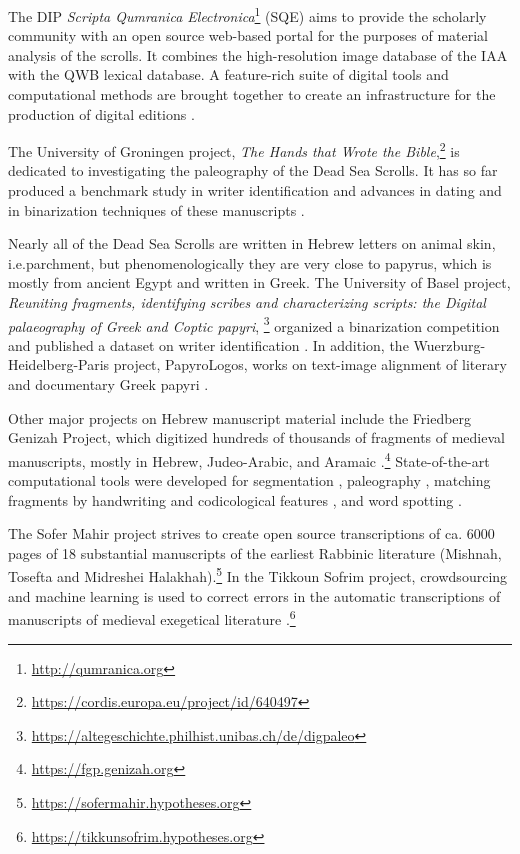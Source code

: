 The DIP \textit{Scripta Qumranica
Electronica}\footnote{\url{http://qumranica.org}} (SQE) 
aims to provide the scholarly community with an open source web-based portal
for the purposes of material analysis of the  scrolls.  It combines the
high-resolution image database of the IAA with the QWB lexical database.  A
feature-rich suite of digital tools and computational methods are brought
together to create an infrastructure for the production of digital editions
\cite{SQE}. %

The University of Groningen 
project, \textit{The Hands that Wrote the
Bible},\footnote{\url{https://cordis.europa.eu/project/id/640497}} is dedicated
to investigating the paleography of the Dead Sea Scrolls.  It has so far
produced a benchmark study in writer identification \cite {DhaliEtAl2017} and
advances in dating \cite{DhaliEtAl2020dating} and in binarization techniques of
these manuscripts \cite{DhaliEtAl2019}.

Nearly all of the Dead Sea Scrolls are written in Hebrew letters on animal
skin, i.e.\@ parchment, but phenomenologically they are very close to papyrus,
which is mostly from ancient Egypt and written in Greek.  The University of
Basel 
project, \textit{Reuniting fragments, identifying scribes and characterizing
scripts: the Digital palaeography of Greek and Coptic papyri},%
\footnote{\url{https://altegeschichte.philhist.unibas.ch/de/digpaleo}}
organized a binarization competition \cite{Pratikakis2019} and published a
dataset on writer identification \cite{Mohammed2019b}.  In addition, the
Wuerzburg-Heidelberg-Paris project, PapyroLogos, works on text-image alignment
of literary and documentary Greek papyri \cite{KiesslingStoekl2019}.

Other major projects on Hebrew manuscript material include the 
Friedberg Genizah Project, which digitized hundreds of thousands of fragments
of medieval manuscripts, mostly in Hebrew, Judeo-Arabic, and Aramaic
\cite{FGP}.\footnote{\url{https://fgp.genizah.org}} State-of-the-art
computational tools were developed for segmentation \cite{Catalog}, paleography
\cite{Paleo}, matching fragments by handwriting and codicological features
\cite{Join}, and word spotting \cite{Spot}. 

The Sofer Mahir project strives to create open source transcriptions of ca.\@
6000 pages of 18 substantial manuscripts of the earliest Rabbinic literature
(Mishnah, Tosefta and Midreshei
Halakhah).\footnote{\url{https://sofermahir.hypotheses.org}} In the Tikkoun
Sofrim project,  crowdsourcing and machine learning is used to correct errors
in the automatic transcriptions of manuscripts of medieval exegetical
literature
\cite{Kuflik2019}.\footnote{\url{https://tikkunsofrim.hypotheses.org}}


